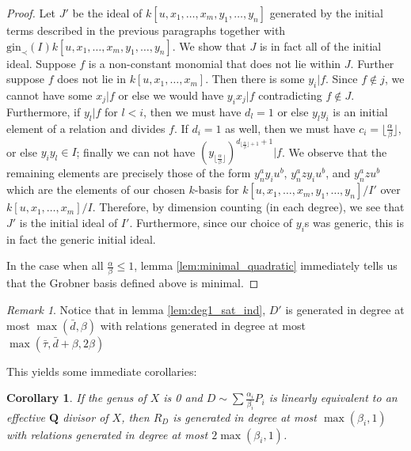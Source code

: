 \documentclass{amsart}
\theoremstyle{plain}
\newtheorem{cor}[thm]{Corollary}
\theoremstyle{definition}
\theoremstyle{remark}
\newtheorem{rem}[thm]{Remark}
\numberwithin{equation}{section}
\newcommand \gin{\text{gin}}
\begin{document}
\begin{proof}
Let $J'$ be the ideal of $k[u, x_1, \ldots, x_m, y_1, \ldots, y_n]$ generated by the initial 
terms described in the previous paragraphs together with $\gin_\prec(I)k[u, x_1, \ldots, 
x_m, y_1, \ldots, y_n]$.  We show that $J$ is in fact all of the initial ideal.  Suppose $f$ is a 
non-constant monomial that does not lie within $J$.  Further suppose $f$ does not lie in 
$k[u, x_1, \ldots, x_m]$.  Then there is some $y_i|f$.  Since $f\not\in j$, we cannot have 
some $x_j|f$ or else we would have $y_ix_j|f$ contradicting $f\not\in J$.  Furthermore, if 
$y_l|f$ for $l<i$, then we must have $d_l=1$ or else $y_ly_i$ is an initial element of a 
relation and divides $f$.  If $d_i=1$ as well, then we must have $c_i=\lfloor \frac{\alpha}
{\beta}\rfloor$, or else $y_iy_l\in I$; finally we can not have $(y_{\lfloor \frac{\alpha}{\beta}
\rfloor})^{d_{\lfloor \frac{\alpha}{\beta} \rfloor+1}+1}|f$.  We observe that the remaining 
elements are precisely those of the form $y_n^a y_i u^b$, $y_n^a zy_iu^b$, and $y_n^a z 
u^b$ which are the elements of our chosen $k$-basis for $k[u, x_1, \ldots, x_m, y_1, \ldots, 
y_n]/I'$ over $k[u, x_1, \ldots, x_m]/I$.  Therefore, by dimension counting (in each degree), 
we see that $J'$ is the initial ideal of $I'$.  Furthermore, since our choice of $y_i$s was 
generic, this is in fact the generic initial ideal.

In the case when all $\frac{\alpha}{\beta}\le 1$, lemma \ref{lem:minimal_quadratic} immediately tells us that the Grobner basis defined above is minimal.
\end{proof}

\begin{rem}\label{rem:deg1_sat_ind_gen_rel_degrees}
Notice that in lemma \ref{lem:deg1_sat_ind}, $D'$ is generated in degree at most $\max(\bar{d}, \beta)$ with relations generated in degree at most $\max(\bar{\tau}, \bar{d} + \beta, 2 \beta)$
\end{rem}

This yields some immediate corollaries:

\begin{cor}\label{cor:effective_Q_divisor_can_ring}
If the genus of $X$ is 0 and $D\sim\sum \frac{\alpha_i}{\beta_i} P_i$ is linearly equivalent to an effective $\mathbf{Q}$ divisor of $X$, then $R_D$ is generated in degree at most $\max(\beta_i,1)$ with relations generated in degree at most $2\max(\beta_i,1)$.
\end{cor}
\end{document}
